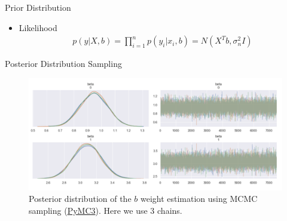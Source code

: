 \documentclass[10pt]{beamer}
\begin{document}
\begin{frame}{Prior Distribution}
\begin{itemize}
\begin{center}
\begin{figure}
\caption{Prior Distribution, for this example
$
\Sigma_p=
\left(
\begin{array}{cc}
2 & 1 \\
1 & 2
\end{array}
\right).
$
}
\end{figure}
\end{center}
\item Likelihood
\begin{align*}
p(y|X, b) 
= \prod_{i=1}^{n}p(y_i|x_i, b) 
= N(X^T b, \sigma_n^2 I)
\end{align*}
\end{itemize}
\end{frame}

\begin{frame}{Posterior Distribution Sampling }{\cite{pymc3}}
\begin{center}
\begin{figure}
\includegraphics[scale=0.25]{images/lin_posterior_pymc3.png} 
\caption{Posterior distribution of the $b$ weight estimation using MCMC sampling (\href{https://docs.pymc.io/}{PyMC3}). Here we use 3 chains. }
\end{figure}
\end{center}
\end{frame}
\end{document}
